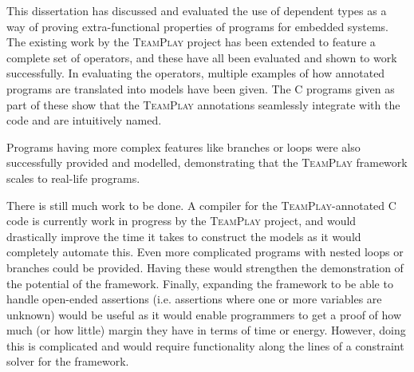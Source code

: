 This dissertation has discussed and evaluated the use of dependent types as a way of proving extra-functional properties of programs for embedded systems. The existing work by the \textsc{TeamPlay} project has been extended to feature a complete set of operators, and these have all been evaluated and shown to work successfully. In evaluating the operators, multiple examples of how annotated programs are translated into \Idris models have been given. The C programs given as part of these show that the \textsc{TeamPlay} annotations seamlessly integrate with the code and are intuitively named.

Programs having more complex features like branches or loops were also successfully provided and modelled, demonstrating that the \textsc{TeamPlay} framework scales to real-life programs.

There is still much work to be done. A compiler for the \textsc{TeamPlay}-annotated C code is currently work in progress by the \textsc{TeamPlay} project, and would drastically improve the time it takes to construct the \Idris models as it would completely automate this. Even more complicated programs with nested loops or branches could be provided. Having these would strengthen the demonstration of the potential of the framework. Finally, expanding the framework to be able to handle open-ended assertions (i.e. assertions where one or more variables are unknown) would be useful as it would enable programmers to get a proof of how much (or how little) margin they have in terms of time or energy. However, doing this is complicated and would require functionality along the lines of a constraint solver for the framework.
